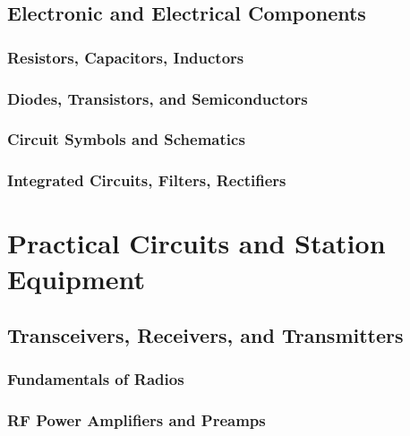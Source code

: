 \documentclass[12pt]{book}
\begin{document}
\chapter{Electronic and Electrical Components}
\section{Resistors, Capacitors, Inductors}

\section{Diodes, Transistors, and Semiconductors}


\section{Circuit Symbols and Schematics}

\section{Integrated Circuits, Filters, Rectifiers}


\part{Practical Circuits and Station Equipment}
\chapter{Transceivers, Receivers, and Transmitters}
\section{Fundamentals of Radios}



\section{RF Power Amplifiers and Preamps}

\end{document}
